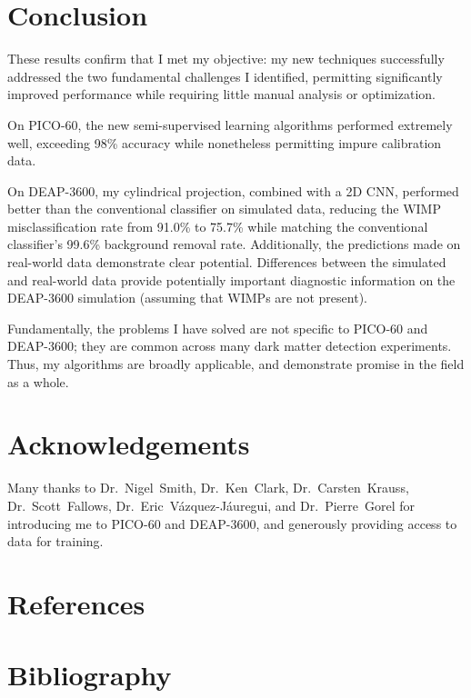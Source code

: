 \documentclass[12pt]{article}
\begin{document}
\section{Conclusion}

These results confirm that I met my objective: my new techniques successfully addressed the two fundamental challenges I identified, permitting significantly improved performance while requiring little manual analysis or optimization.

On PICO-60, the new semi-supervised learning algorithms performed extremely well, exceeding 98\% accuracy while nonetheless permitting impure calibration data.

On DEAP-3600, my cylindrical projection, combined with a 2D CNN, performed better than the conventional classifier on simulated data, reducing the WIMP misclassification rate from 91.0\% to 75.7\% while matching the conventional classifier's 99.6\% background removal rate. Additionally, the predictions made on real-world data demonstrate clear potential. Differences between the simulated and real-world data provide potentially important diagnostic information on the DEAP-3600 simulation (assuming that WIMPs are not present).

Fundamentally, the problems I have solved are not specific to PICO-60 and DEAP-3600; they are common across many dark matter detection experiments. Thus, my algorithms are broadly applicable, and demonstrate promise in the field as a whole.

\section{Acknowledgements}

Many thanks to Dr.~Nigel~Smith, Dr.~Ken~Clark, Dr.~Carsten~Krauss, Dr.~Scott~Fallows, Dr.~Eric~V\'azquez-J\'auregui, and Dr.~Pierre~Gorel for introducing me to PICO-60 and DEAP-3600, and generously providing access to data for training.

\section{References}

\printbibliography[heading=none]

\pagebreak

\section{Bibliography}
\end{document}
